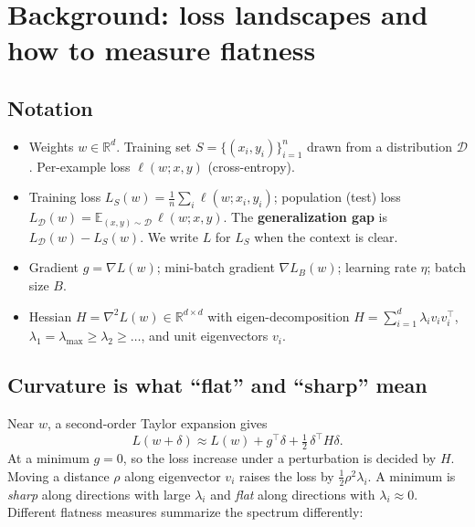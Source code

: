 \documentclass[11pt]{article}
\newcommand{\R}{\mathbb{R}}
\newcommand{\E}{\mathbb{E}}
\newcommand{\Ls}{L_S}                    %
\newcommand{\Ld}{L_{\mathcal{D}}}        %
\newcommand{\lmax}{\lambda_{\max}}
\theoremstyle{plain}
\begin{document}
\section{Background: loss landscapes and how to measure flatness}
\label{sec:background}

\subsection{Notation}

\begin{itemize}
  \item Weights $w \in \R^d$. Training set $S = \{(x_i,y_i)\}_{i=1}^n$ drawn from a distribution $\mathcal{D}$.
        Per-example loss $\ell(w;x,y)$ (cross-entropy).
  \item Training loss $\Ls(w) = \frac1n\sum_i \ell(w;x_i,y_i)$; population (test) loss $\Ld(w) = \E_{(x,y)\sim\mathcal{D}}\,\ell(w;x,y)$.
        The \textbf{generalization gap} is $\Ld(w) - \Ls(w)$. We write $L$ for $\Ls$ when the context is clear.
  \item Gradient $g = \nabla L(w)$; mini-batch gradient $\nabla L_B(w)$; learning rate $\eta$; batch size $B$.
  \item Hessian $H = \nabla^2 L(w) \in \R^{d\times d}$ with eigen-decomposition $H = \sum_{i=1}^d \lambda_i v_i v_i^\top$,
        $\lambda_1 = \lmax \ge \lambda_2 \ge \dots$, and unit eigenvectors $v_i$.
\end{itemize}

\subsection{Curvature is what ``flat'' and ``sharp'' mean}

Near $w$, a second-order Taylor expansion gives
\begin{equation}
  L(w+\delta) \approx L(w) + g^\top \delta + \tfrac12\,\delta^\top H \delta .
  \label{eq:taylor}
\end{equation}
At a minimum $g = 0$, so the loss increase under a perturbation is decided by $H$. Moving a distance $\rho$ along
eigenvector $v_i$ raises the loss by $\tfrac12 \rho^2 \lambda_i$. A minimum is \emph{sharp} along directions with large $\lambda_i$
and \emph{flat} along directions with $\lambda_i \approx 0$. Different flatness measures summarize the spectrum differently:
\end{document}
